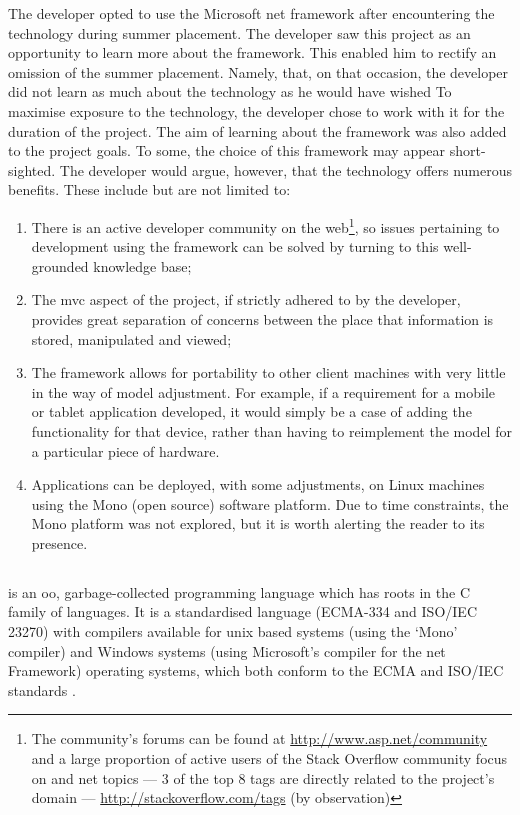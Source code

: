The developer opted to use the Microsoft \gls{net} framework after encountering the technology during summer placement.   
The developer saw this project as an opportunity to learn more about the framework.  
This enabled him to rectify an omission of the summer placement.  Namely, that, on that occasion, the developer did not learn as much about the technology as he would have wished \cite{summerPlacementReport}
To maximise exposure to the technology, the developer chose to work with it for the duration of the project.  The aim of learning about the framework was also added to the project goals. To some, the choice of this framework may appear short-sighted.  The developer would argue, however, that the technology offers numerous benefits.  These include but are not limited to: 
\begin{enumerate}
	\item There is an active developer community on the web\footnote{The community's forums can be found at \url{http://www.asp.net/community} and a large proportion of active users of the Stack Overflow community focus on \cs{} and \gls{net} topics --- 3 of the top 8 tags are directly related to the project's domain --- \url{http://stackoverflow.com/tags} (by observation)}, so issues pertaining to development using the framework can be solved by turning to this well-grounded knowledge base;
	\item The \gls{mvc} aspect of the project, if strictly adhered to by the developer, provides great separation of concerns between the place that information is stored, manipulated and viewed;
	\item The framework allows for portability to other client machines with very little in the way of model adjustment. For example, if a requirement for a mobile or tablet application developed, it would simply be a case of adding the functionality for that device, rather than having to reimplement the model for a particular piece of hardware.
	\item Applications can be deployed, with some adjustments, on Linux machines using the Mono (open source) software platform.  Due to time constraints, the Mono platform was not explored, but it is worth alerting the reader to its presence.
\end{enumerate}

\subsection{\cs}
\label{csharpDiscussion}
\cs{} is an \gls{oo}, garbage-collected programming language which has roots in the C family of languages.  It is a standardised language (ECMA-334 and ISO/IEC 23270) with compilers available for unix based systems (using the `Mono' compiler) and Windows systems (using Microsoft's \cs{} compiler for the \gls{net} Framework) operating systems, which both conform to the ECMA and ISO/IEC standards \cite{monoStandardised} \cite{csPL}.

